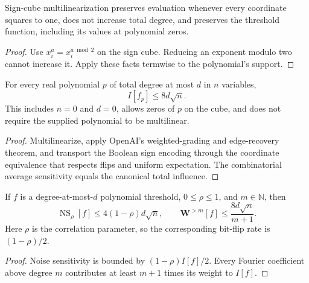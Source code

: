 \begin{theorem}
  \label{thm:analysis-sign-multilinearize}
  \leanok
  Sign-cube multilinearization preserves evaluation whenever every coordinate
  squares to one, does not increase total degree, and preserves the threshold
  function, including its values at polynomial zeros.
\end{theorem}
\begin{proof}
  \leanok
  Use $x_i^a=x_i^{a\bmod 2}$ on the sign cube. Reducing an exponent modulo two
  cannot increase it. Apply these facts termwise to the polynomial's support.
\end{proof}

\begin{theorem}
  \label{thm:analysis-gotsman-linial}
  \leanok
  For every real polynomial $p$ of total degree at most $d$ in $n$ variables,
  \[
    I[f_p]\le 8d\sqrt n.
  \]
  This includes $n=0$ and $d=0$, allows zeros of $p$ on the cube, and does not
  require the supplied polynomial to be multilinear.
\end{theorem}
\begin{proof}
  \leanok
  Multilinearize, apply OpenAI's weighted-grading and edge-recovery theorem,
  and transport the Boolean sign encoding through the coordinate equivalence
  that respects flips and uniform expectation. The combinatorial average
  sensitivity equals the canonical total influence.
\end{proof}

\begin{corollary}
  \label{cor:analysis-polynomial-threshold-spectral}
  \leanok
  If $f$ is a degree-at-most-$d$ polynomial threshold, $0\le\rho\le1$, and
  $m\in\mathbb N$, then
  \[
    \operatorname{NS}_{\rho}[f]\le4(1-\rho)d\sqrt n,
    \qquad
    \mathbf W^{>m}[f]\le\frac{8d\sqrt n}{m+1}.
  \]
  Here $\rho$ is the correlation parameter, so the corresponding bit-flip
  rate is $(1-\rho)/2$.
\end{corollary}
\begin{proof}
  \leanok
  Noise sensitivity is bounded by $(1-\rho)I[f]/2$. Every Fourier coefficient
  above degree $m$ contributes at least $m+1$ times its weight to $I[f]$.
\end{proof}

